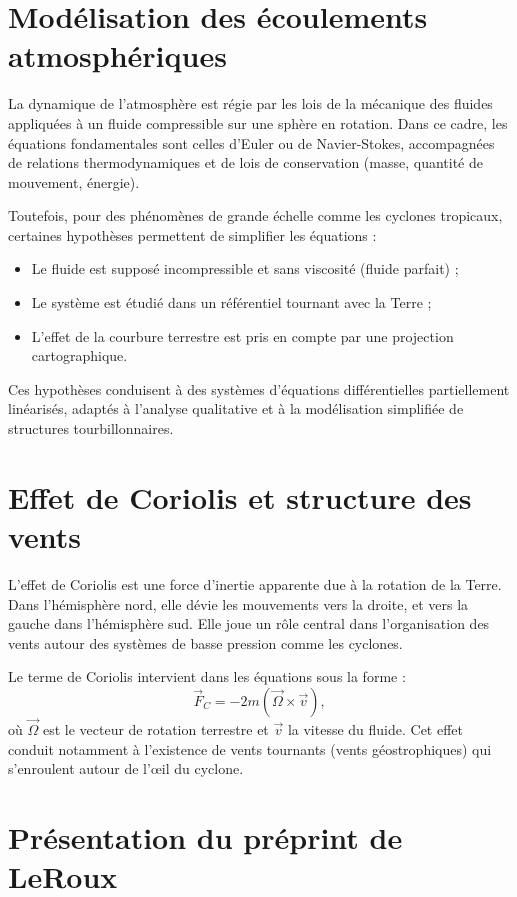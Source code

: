 \section{Modélisation des écoulements atmosphériques}

La dynamique de l’atmosphère est régie par les lois de la mécanique des fluides appliquées à un fluide compressible sur une sphère en rotation. Dans ce cadre, les équations fondamentales sont celles d’Euler ou de Navier-Stokes, accompagnées de relations thermodynamiques et de lois de conservation (masse, quantité de mouvement, énergie).

Toutefois, pour des phénomènes de grande échelle comme les cyclones tropicaux, certaines hypothèses permettent de simplifier les équations :
\begin{itemize}
    \item Le fluide est supposé incompressible et sans viscosité (fluide parfait) ;
    \item Le système est étudié dans un référentiel tournant avec la Terre ;
    \item L'effet de la courbure terrestre est pris en compte par une projection cartographique.
\end{itemize}

Ces hypothèses conduisent à des systèmes d’équations différentielles partiellement linéarisés, adaptés à l’analyse qualitative et à la modélisation simplifiée de structures tourbillonnaires.

\section{Effet de Coriolis et structure des vents}

L’effet de Coriolis est une force d’inertie apparente due à la rotation de la Terre. Dans l’hémisphère nord, elle dévie les mouvements vers la droite, et vers la gauche dans l’hémisphère sud. Elle joue un rôle central dans l’organisation des vents autour des systèmes de basse pression comme les cyclones.

Le terme de Coriolis intervient dans les équations sous la forme :
\[
\vec{F}_C = -2m (\vec{\Omega} \times \vec{v}),
\]
où \( \vec{\Omega} \) est le vecteur de rotation terrestre et \( \vec{v} \) la vitesse du fluide. Cet effet conduit notamment à l’existence de vents tournants (vents géostrophiques) qui s’enroulent autour de l’œil du cyclone.

\section{Présentation du préprint de LeRoux}

